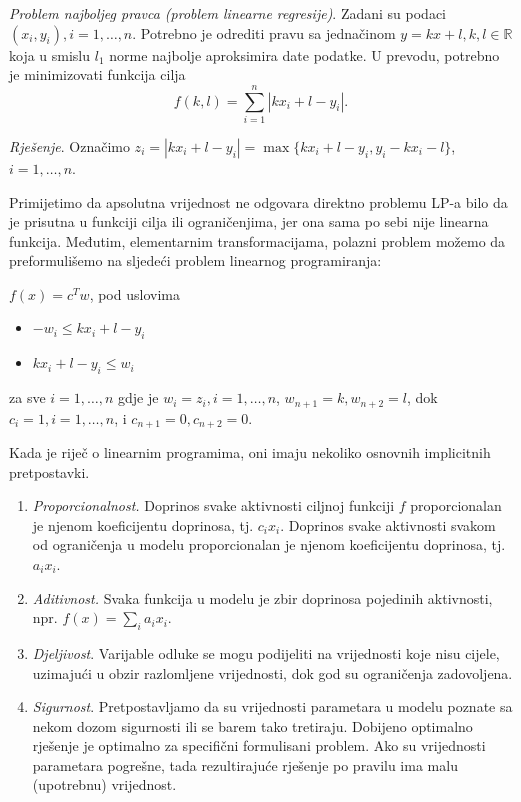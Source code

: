 \documentclass[a4paper, utf8, 11pt, colorlinks]{book}
\begin{document}
\emph{Problem najboljeg pravca (problem linearne regresije)}. Zadani su podaci $(x_i, y_i), i = 1, \ldots , n$. Potrebno je odrediti pravu sa jednačinom $y = k x + l,
k, l \in \mathbb{R}$ koja u smislu $l_1$ norme najbolje aproksimira date podatke. U prevodu, potrebno je minimizovati  funkcija cilja $$f(k, l) = \sum_{i=1}^n |k x_i + l - y_i|.$$

\emph{Rješenje}.
Označimo $z_i = |k x_i + l - y_i| = \max\{k x_i + l - y_i, y_i - k x_i - l \}$, $i=1,\ldots,n$. 

Primijetimo da apsolutna vrijednost ne odgovara direktno problemu LP-a bilo da je prisutna u funkciji cilja ili ograničenjima, jer ona sama po sebi nije linearna funkcija. Međutim, elementarnim transformacijama, polazni problem možemo da preformulišemo na sljedeći  problem linearnog programiranja: %

$f(x) = c^T w$, pod uslovima
\begin{itemize}
    \item $ -w_i \leq k x_i + l - y_i$ 
    \item $ k x_i + l - y_i \leq w_i $
\end{itemize}
za sve $i = 1, \ldots, n$ gdje je 
$w_i = z_i, i=1,\ldots,n$, $w_{n+1} = k, w_{n+2} = l$, dok 
$c_i = 1, i=1,\ldots,n$, i $c_{n+1} = 0, c_{n+2} = 0$. 



 
Kada je riječ o linearnim programima,  oni imaju nekoliko osnovnih implicitnih pretpostavki. 
\begin{enumerate}
    \item \emph{Proporcionalnost.} Doprinos svake aktivnosti ciljnoj funkciji $f$ proporcionalan je njenom koeficijentu doprinosa, tj. $c_ix_i$. Doprinos svake aktivnosti svakom od  ograničenja u modelu proporcionalan je njenom  koeficijentu doprinosa, tj. $a_ix_i$.
    \item  \emph{Aditivnost.} Svaka funkcija u modelu je zbir  doprinosa pojedinih aktivnosti, npr. $f(x) = \sum_i a_i x_i$.
    \item \emph{Djeljivost}. Varijable odluke se mogu podijeliti na vrijednosti koje nisu cijele, uzimajući u obzir  razlomljene vrijednosti, dok god su ograničenja zadovoljena.  
    \item \emph{Sigurnost}. Pretpostavljamo da su vrijednosti parametara u modelu poznate
    sa nekom dozom sigurnosti ili se barem tako tretiraju. Dobijeno optimalno rješenje je optimalno za specifični formulisani problem. Ako su vrijednosti parametara pogrešne, tada rezultirajuće rješenje po pravilu ima malu (upotrebnu)  vrijednost.  
\end{enumerate}
\end{document}
